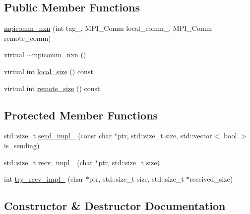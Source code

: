 \subsection*{Public Member Functions}
\begin{DoxyCompactItemize}
\item 
\hyperlink{classmui_1_1mpicomm__nxn_a24d70a22e6191946b0f428963f0f3d36}{mpicomm\+\_\+nxn} (int tag\+\_\+, M\+P\+I\+\_\+\+Comm local\+\_\+comm\+\_\+, M\+P\+I\+\_\+\+Comm remote\+\_\+comm)
\item 
virtual \hyperlink{classmui_1_1mpicomm__nxn_a7fe76b7f261054474e5b63e24248c1ab}{$\sim$mpicomm\+\_\+nxn} ()
\item 
virtual int \hyperlink{classmui_1_1mpicomm__nxn_aa30777638394ee6f17851f06c7793454}{local\+\_\+size} () const
\item 
virtual int \hyperlink{classmui_1_1mpicomm__nxn_ac5597865b5cad6ed82e02f40aa8333b9}{remote\+\_\+size} () const
\end{DoxyCompactItemize}
\subsection*{Protected Member Functions}
\begin{DoxyCompactItemize}
\item 
std\+::size\+\_\+t \hyperlink{classmui_1_1mpicomm__nxn_a41700dbff6ae17c428693e4d124f8a8e}{send\+\_\+impl\+\_\+} (const char $\ast$ptr, std\+::size\+\_\+t size, std\+::vector$<$ bool $>$ is\+\_\+sending)
\item 
std\+::size\+\_\+t \hyperlink{classmui_1_1mpicomm__nxn_a6536b08629d41473e0597b2d4fff794e}{recv\+\_\+impl\+\_\+} (char $\ast$ptr, std\+::size\+\_\+t size)
\item 
int \hyperlink{classmui_1_1mpicomm__nxn_afb57050d55372c84325324340e15ac42}{try\+\_\+recv\+\_\+impl\+\_\+} (char $\ast$ptr, std\+::size\+\_\+t size, std\+::size\+\_\+t $\ast$received\+\_\+size)
\end{DoxyCompactItemize}


\subsection{Constructor \& Destructor Documentation}
\mbox{\label{classmui_1_1mpicomm__nxn_a24d70a22e6191946b0f428963f0f3d36}} 
